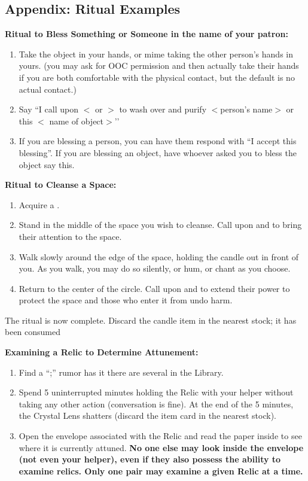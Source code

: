 \documentclass[green]{GL2020}
\begin{document}
\subsection*{Appendix: Ritual Examples}

\textbf{Ritual to Bless Something or Someone in the name of your patron:}
  \begin{enumerate}
    \item Take the object in your hands, or mime taking the other person’s hands in yours. (you may ask for OOC permission and then actually take their hands if you are both comfortable with the physical contact, but the default is no actual contact.)
    \item Say ``I call upon $<$\cEbb{} or \cFlow{}$>$ to wash over and purify  $<$person’s name$>$ or this $<$ name of object$>$’’
    \item If you are blessing a person, you can have them respond with ``I accept this blessing''. If you are blessing an object, have whoever asked you to bless the object say this.
  \end{enumerate}

\textbf{Ritual to Cleanse a Space:}
  \begin{enumerate}
    \item Acquire a \iRitualCandle{}.
    \item Stand in the middle of the space you wish to cleanse. Call upon \cEbb{} and \cFlow{} to bring their attention to the space.
    \item Walk slowly around the edge of the space, holding the candle out in front of you. As you walk, you may do so silently, or hum, or chant as you choose.
    \item Return to the center of the circle. Call upon \cEbb{} and \cFlow{} to extend their power to protect the space and those who enter it from undo harm.
  \end{enumerate}
The ritual is now complete. Discard the candle item in the nearest stock; it has been consumed
   
\textbf{Examining a Relic to Determine Attunement:}
  \begin{enumerate}
    \item Find a ``\iCrystalLens{};'' rumor has it there are several in the Library. 
    \item Spend 5 uninterrupted minutes holding the Relic with your helper without taking any other action (conversation is fine). At the end of the 5 minutes, the Crystal Lens shatters (discard the item card in the nearest stock). 
    \item Open the envelope associated with the Relic and read the paper inside to see where it is currently attuned. \textbf{No one else may look inside the envelope (not even your helper), even if they also possess the ability to examine relics. Only one pair may examine a given Relic at a time.}
  \end{enumerate}
   
\end{document}
